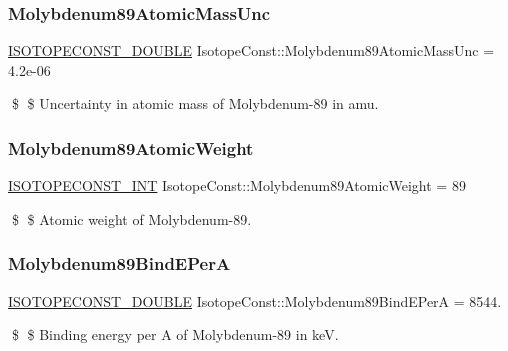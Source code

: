 \subsubsection{\texorpdfstring{Molybdenum89\+Atomic\+Mass\+Unc}{Molybdenum89AtomicMassUnc}}
{\footnotesize\ttfamily \mbox{\hyperlink{group___isotope_const-_macros_ga8f45a7272ce02c0b4c65c44636ed719a}{I\+S\+O\+T\+O\+P\+E\+C\+O\+N\+S\+T\+\_\+\+D\+O\+U\+B\+LE}} Isotope\+Const\+::\+Molybdenum89\+Atomic\+Mass\+Unc = 4.\+2e-\/06}

\$ \$ Uncertainty in atomic mass of Molybdenum-\/89 in amu. \mbox{\label{group___isotope_const-_molybdenum-_mo89_ga1f9a55eb3914367dbe63d586371829f9}} 
\subsubsection{\texorpdfstring{Molybdenum89\+Atomic\+Weight}{Molybdenum89AtomicWeight}}
{\footnotesize\ttfamily \mbox{\hyperlink{group___isotope_const-_macros_ga5f18360b3e99483a35c32d789e62621c}{I\+S\+O\+T\+O\+P\+E\+C\+O\+N\+S\+T\+\_\+\+I\+NT}} Isotope\+Const\+::\+Molybdenum89\+Atomic\+Weight = 89}

\$ \$ Atomic weight of Molybdenum-\/89. \mbox{\label{group___isotope_const-_molybdenum-_mo89_ga770a722d4de7454ac3eb5054c43da78d}} 
\subsubsection{\texorpdfstring{Molybdenum89\+Bind\+E\+PerA}{Molybdenum89BindEPerA}}
{\footnotesize\ttfamily \mbox{\hyperlink{group___isotope_const-_macros_ga8f45a7272ce02c0b4c65c44636ed719a}{I\+S\+O\+T\+O\+P\+E\+C\+O\+N\+S\+T\+\_\+\+D\+O\+U\+B\+LE}} Isotope\+Const\+::\+Molybdenum89\+Bind\+E\+PerA = 8544.}

\$ \$ Binding energy per A of Molybdenum-\/89 in keV. \mbox{\label{group___isotope_const-_molybdenum-_mo89_ga469fb72f0ea53993da082384a0021ab6}} 
